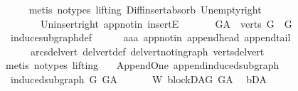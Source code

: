 \begin{isabellebody}
\ \ \ \ \isamarkupfalse%
\ {\isacharparenleft}{\kern0pt}metis\ {\isacharparenleft}{\kern0pt}no{\isacharunderscore}{\kern0pt}types{\isacharcomma}{\kern0pt}\ lifting{\isacharparenright}{\kern0pt}\ Diff{\isacharunderscore}{\kern0pt}insert{\isacharunderscore}{\kern0pt}absorb\ Un{\isacharunderscore}{\kern0pt}empty{\isacharunderscore}{\kern0pt}right\isanewline
\ \ \ \ \ \ \ \ Un{\isacharunderscore}{\kern0pt}insert{\isacharunderscore}{\kern0pt}right\ app{\isacharunderscore}{\kern0pt}notin\ insertE{\isacharparenright}{\kern0pt}\ \ \isanewline
\ \ \isamarkupfalse%
\ \ {\isachardoublequoteopen}G{\isacharunderscore}{\kern0pt}A\ {\isasymrestriction}\ verts\ G\ {\isacharequal}{\kern0pt}\ G{\isachardoublequoteclose}\ \isanewline
\ \ \ \ \isamarkupfalse%
\ \ induce{\isacharunderscore}{\kern0pt}subgraph{\isacharunderscore}{\kern0pt}def\isanewline
\ \ \ \ \isamarkupfalse%
\ aaa\ app{\isacharunderscore}{\kern0pt}notin\ append{\isacharunderscore}{\kern0pt}head\ append{\isacharunderscore}{\kern0pt}tail\ \isanewline
\ \ \ \ \ \ arcs{\isacharunderscore}{\kern0pt}del{\isacharunderscore}{\kern0pt}vert\ del{\isacharunderscore}{\kern0pt}vert{\isacharunderscore}{\kern0pt}def\ del{\isacharunderscore}{\kern0pt}vert{\isacharunderscore}{\kern0pt}not{\isacharunderscore}{\kern0pt}in{\isacharunderscore}{\kern0pt}graph\ verts{\isacharunderscore}{\kern0pt}del{\isacharunderscore}{\kern0pt}vert\isanewline
\ \ \ \ \isamarkupfalse%
\ {\isacharparenleft}{\kern0pt}metis\ {\isacharparenleft}{\kern0pt}no{\isacharunderscore}{\kern0pt}types{\isacharcomma}{\kern0pt}\ lifting{\isacharparenright}{\kern0pt}{\isacharparenright}{\kern0pt}\ \isanewline
{}\isamarkupfalse%
%
\endisatagproof
{\isafoldproof}%
%
\isadelimproof
\isanewline
%
\endisadelimproof
\isanewline
{}\isamarkupfalse%
\ {\isacharparenleft}{\kern0pt}\ Append{\isacharunderscore}{\kern0pt}One{\isacharparenright}{\kern0pt}\ append{\isacharunderscore}{\kern0pt}induced{\isacharunderscore}{\kern0pt}subgraph{\isacharcolon}{\kern0pt}\ \isanewline
\ \ {\isachardoublequoteopen}induced{\isacharunderscore}{\kern0pt}subgraph\ G\ G{\isacharunderscore}{\kern0pt}A\ {\isachardoublequoteclose}\isanewline
%
\isadelimproof
%
\endisadelimproof
%
\isatagproof
{}\isamarkupfalse%
\ {\isacharminus}{\kern0pt}\isanewline
\ \ \isamarkupfalse%
\ W{\isacharcolon}{\kern0pt}\ blockDAG\ {\isachardoublequoteopen}G{\isacharunderscore}{\kern0pt}A{\isachardoublequoteclose}\ \isamarkupfalse%
\ bD{\isacharunderscore}{\kern0pt}A\ \isamarkupfalse%

\end{isabellebody}
